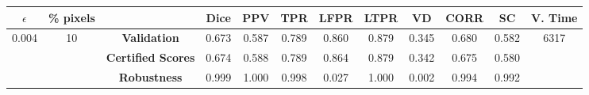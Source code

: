 \begin{longtable}{ c  c | c | c  c  c  c  c  c  c c c}
\toprule \textbf{$\epsilon$} & \textbf{\% pixels} & & \textbf{Dice} & \textbf{PPV} & \textbf{TPR} & \textbf{LFPR} & \textbf{LTPR} & \textbf{VD} & \textbf{CORR} & \textbf{SC} & \textbf{V. Time} \\
\midrule 
\multirow{3}{*}{0.004}  & \multirow{3}{*}{10} &\textbf{Validation} & 0.673 & 0.587 & 0.789 & 0.860 & 0.879 & 0.345 & 0.680 & 0.582 & \multirow{3}{*}{6317} \\
 & & \textbf{Certified Scores} & 0.674 & 0.588 & 0.789 & 0.864 & 0.879 & 0.342 & 0.675 & 0.580 & \\
& & \textbf{Robustness} & 0.999 & 1.000 & 0.998 & 0.027 & 1.000 & 0.002 & 0.994 & 0.992 & \\
\end{longtable}